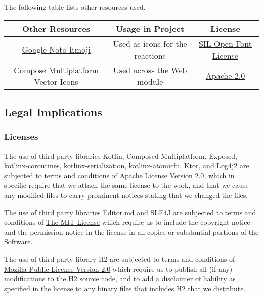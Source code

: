 \documentclass[a4paper]{article}
\begin{document}
    The following table lists other resources used.

    \begin{table}[H]
        \begin{tabular}{c|c|c}
            Other Resources                                                             & Usage in Project                & License                                                                                         \\
            \hline
            \href{https://fonts.google.com/noto/specimen/Noto+Emoji}{Google Noto Emoji} & Used as icons for the reactions & \href{https://scripts.sil.org/cms/scripts/page.php?site_id=nrsi\&           id=OFL}{SIL Open Font License} \\
            Compose Multiplatform Vector Icons                                          & Used across the Web module      & \href{https://github.com/JetBrains/compose-multiplatform/blob/master/LICENSE.txt}{Apache 2.0}   \\
        \end{tabular}
    \end{table}

    \subsection*{Legal Implications}

    \subsubsection*{Licenses}

    The use of third party libraries Kotlin, Composed Multiplatform, Exposed, kotlinx-coroutines, kotlinx-serialization, kotlinx-atomicfu, Ktor, and Log4j2 are subjected to terms and conditions of \href{http://www.apache.org/licenses/LICENSE-2.0}{Apache License Version 2.0}, which in specific require that we attach the same license to the work, and that we cause any modified files to carry prominent notices stating that we changed the files.

    The use of third party libraries Editor.md and SLF4J are subjected to terms and conditions of \href{https://mit-license.org/}{The MIT License} which require us to include the copyright notice and the permission notice in the license in all copies or substantial portions of the Software.

    The use of third party library H2 are subjected to terms and conditions of \href{https://www.mozilla.org/en-US/MPL/2.0/}{Mozilla Public License Version 2.0} which require us to publish all (if any) modifications to the H2 source code, and to add a disclaimer of liability as specified in the license to any binary files that includes H2 that we distribute.
\end{document}
